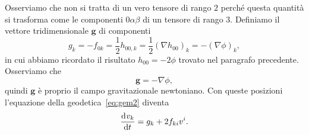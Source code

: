 Osserviamo che non si tratta di un vero tensore di rango $2$ perché questa
quantità si trasforma come le componenti $0\alpha\beta$ di un tensore di rango
$3$.  Definiamo il vettore tridimensionale $\bm{g}$ di componenti
\begin{equation}
  g_{k} = -f_{0k} = \frac{1}{2}h_{00,k} = \frac{1}{2}(\nabla h_{00})_{k} =
  -(\nabla \phi)_{k},
\end{equation}
in cui abbiamo ricordato il risultato $h_{00} = -2\phi$ trovato nel paragrafo
precedente.  Osserviamo che
\begin{equation}
  \bm{g} = -\nabla \phi,
\end{equation}
quindi $\bm{g}$ è proprio il campo gravitazionale newtoniano.  Con queste
posizioni l'equazione della geodetica~\eqref{eq:gem2} diventa
\begin{equation}
  \label{eq:gem3}
  \frac{{\mathop{}\!\mathrm{d}^{}}v_{k}}{\mathop{}\!\mathrm{d} {t}^{}} = g_{k} + 2f_{ki}v^{i}.
\end{equation}

